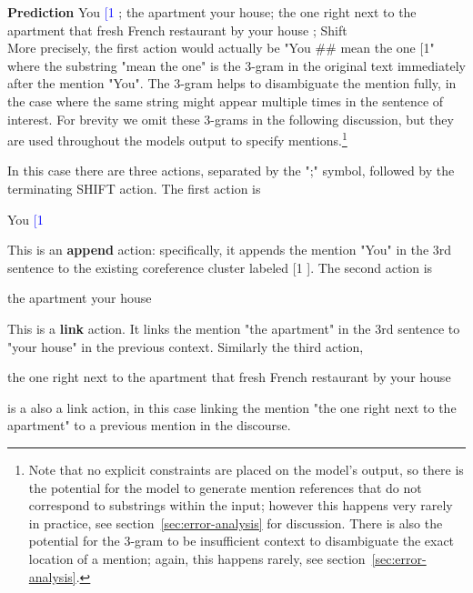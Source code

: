 \documentclass[11pt,a4paper]{article}
\begin{document}
\vspace{2ex}
\noindent
{\bf Prediction} You  \textcolor{blue}{[1} ; the apartment   your house; the one right next to the apartment  that fresh French restaurant by your house ;    {\sc Shift}\\

\noindent
More precisely, the first action would actually be "You \#\# mean the one  [1" where the substring "mean the one" is the 3-gram in the original text immediately after the mention "You". The 3-gram helps to disambiguate the mention fully, in the case where the same string might appear multiple times in the sentence of interest. For brevity we omit these 3-grams in the following discussion, but they are used throughout the models output to specify mentions.\footnote{Note that no explicit constraints are placed on the model's output, so there is the potential for the model to generate mention references that do not correspond to substrings within the input; however this happens very rarely in practice, see section~\ref{sec:error-analysis} for discussion. There is also the potential for the 3-gram to be insufficient context to disambiguate the exact location of a mention; again, this happens rarely, see section~\ref{sec:error-analysis}.}


\vspace{2ex}

\noindent
In this case there are three actions, separated by the ";" symbol, followed by the terminating {\sc SHIFT} action. The first action is

\vspace{2ex}
\noindent
You  \textcolor{blue}{[1}

\vspace{2ex}
\noindent
This is an {\bf append} action: specifically, it appends the mention "You" in the 3rd sentence to the existing coreference cluster labeled [1 ]. The second action is

\vspace{2ex}
\noindent
the apartment   your house

\vspace{2ex}
\noindent
This is a {\bf link} action. It links the mention "the apartment" in the 3rd sentence to "your house" in the previous context. Similarly the third action,

\vspace{2ex}
\noindent
the one right next to the apartment  that fresh French restaurant by your house

\vspace{2ex}
\noindent
is a also a link action, in this case linking the mention "the one right next to the apartment" to a previous mention in the discourse.
\end{document}
